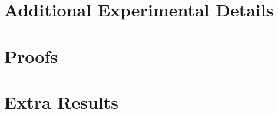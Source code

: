 \documentclass{article}
\theoremstyle{plain}
\theoremstyle{definition}
\theoremstyle{remark}
\begin{document}




\appendix

\section{Additional Experimental Details}
\section{Proofs}
\section{Extra Results}
\end{document}
